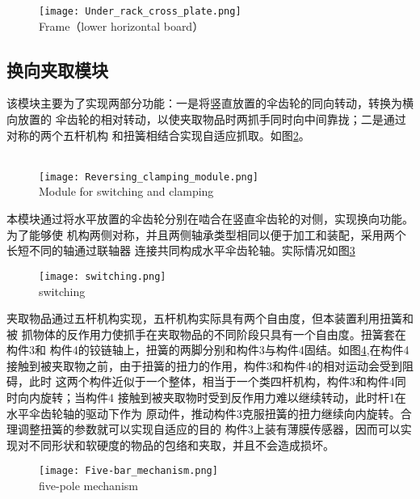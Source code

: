 \begin{figure}[!htp]
  \centering
  \texttt{[image: Under\_rack\_cross\_plate.png]} \\
    {Frame（lower horizontal board）}
  \label{fig:下机架横板}
\end{figure}

\subsection{换向夹取模块}

该模块主要为了实现两部分功能：一是将竖直放置的伞齿轮的同向转动，转换为横向放置的
伞齿轮的相对转动，以使夹取物品时两抓手同时向中间靠拢；二是通过对称的两个五杆机构
和扭簧相结合实现自适应抓取。如图\ref{fig:换向夹取模块}。
\\
\\


\begin{figure}[!htp]
  \centering
  \texttt{[image: Reversing\_clamping\_module.png]} \\
    {Module for switching and clamping}
  \label{fig:换向夹取模块}
\end{figure}

本模块通过将水平放置的伞齿轮分别在啮合在竖直伞齿轮的对侧，实现换向功能。为了能够使
机构两侧对称，并且两侧轴承类型相同以便于加工和装配，采用两个长短不同的轴通过联轴器
连接共同构成水平伞齿轮轴。实际情况如图\ref{fig:switching}

\begin{figure}[!htp]
  \centering
  \texttt{[image: switching.png]} \\
    {switching}
  \label{fig:switching}
\end{figure}
夹取物品通过五杆机构实现，五杆机构实际具有两个自由度，但本装置利用扭簧和被
抓物体的反作用力使抓手在夹取物品的不同阶段只具有一个自由度。扭簧套在构件3和
构件4的铰链轴上，扭簧的两脚分别和构件3与构件4固结。如图\ref{fig:五杆机构},在构件4
接触到被夹取物之前，由于扭簧的扭力的作用，构件3和构件4的相对运动会受到阻碍，此时
这两个构件近似于一个整体，相当于一个类四杆机构，构件3和构件4同时向内旋转；当构件4
接触到被夹取物时受到反作用力难以继续转动，此时杆1在水平伞齿轮轴的驱动下作为
原动件，推动构件3克服扭簧的扭力继续向内旋转。合理调整扭簧的参数就可以实现自适应的目的
构件3上装有薄膜传感器，因而可以实现对不同形状和软硬度的物品的包络和夹取，并且不会造成损坏。

\begin{figure}[!htp]
  \centering
  \texttt{[image: Five-bar\_mechanism.png]} \\
    {five-pole mechanism}
  \label{fig:五杆机构}
\end{figure}

